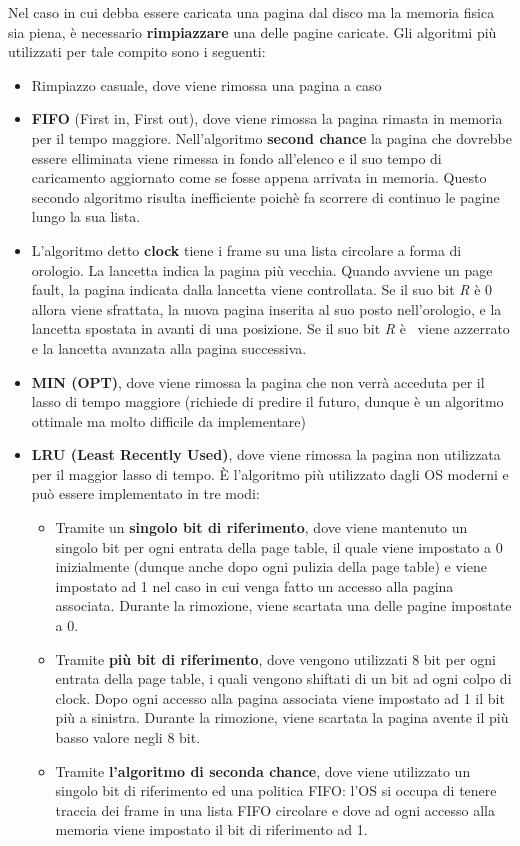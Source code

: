 \documentclass{article}
\begin{document}
Nel caso in cui debba essere caricata una pagina dal disco ma la memoria fisica sia piena, è necessario \textbf{rimpiazzare} una delle pagine caricate. Gli algoritmi più utilizzati per tale compito sono i seguenti:
\begin{itemize}
    \item Rimpiazzo casuale, dove viene rimossa una pagina a caso
    \item \textbf{FIFO} (First in, First out), dove viene rimossa la pagina rimasta in memoria per
    il tempo maggiore. Nell'algoritmo \textbf{second chance} la pagina che dovrebbe essere elliminata viene rimessa in fondo all'elenco e il suo tempo di caricamento aggiornato come se fosse appena arrivata in memoria. Questo secondo algoritmo risulta inefficiente poichè fa scorrere di continuo le pagine lungo la sua lista.
    \item L'algoritmo detto \textbf{clock} tiene i frame su una lista circolare a forma di orologio. La lancetta indica la pagina più vecchia. Quando avviene un page fault, la pagina indicata dalla lancetta viene controllata. Se il suo bit \textit{R} è 0 allora viene sfrattata, la nuova pagina inserita al suo posto nell'orologio, e la lancetta spostata in avanti di una posizione. Se il suo bit \textit{R} è \ viene azzerrato e la lancetta avanzata alla pagina successiva.
    \item \textbf{MIN (OPT)}, dove viene rimossa la pagina che non verrà acceduta per il lasso di tempo maggiore (richiede di predire il futuro, dunque è un algoritmo ottimale ma molto difficile da implementare)
    \item \textbf{LRU (Least Recently Used)}, dove viene rimossa la pagina non utilizzata per il maggior lasso di tempo. È l'algoritmo più utilizzato dagli OS moderni e può essere implementato in tre modi:
    \begin{itemize}
        \item Tramite un \textbf{singolo bit di riferimento}, dove viene mantenuto un singolo bit per ogni entrata della page table, il quale viene impostato a 0 inizialmente (dunque anche dopo ogni pulizia della page table) e viene impostato ad 1 nel caso in cui venga fatto un accesso alla pagina associata.
        Durante la rimozione, viene scartata una delle pagine impostate a 0.
        \item Tramite \textbf{più bit di riferimento}, dove vengono utilizzati 8 bit per ogni entrata della page table, i quali vengono shiftati di un bit ad ogni colpo di clock. Dopo ogni accesso alla pagina associata viene impostato ad 1 il bit più a sinistra.
        Durante la rimozione, viene scartata la pagina avente il più basso valore negli 8 bit.
        \item Tramite \textbf{l'algoritmo di seconda chance}, dove viene utilizzato un singolo bit di riferimento ed una politica FIFO: l'OS si occupa di tenere traccia dei frame in una lista FIFO circolare e dove ad ogni accesso alla memoria viene impostato il bit di riferimento ad 1.\par


\end{itemize}
\end{itemize}
\end{document}
